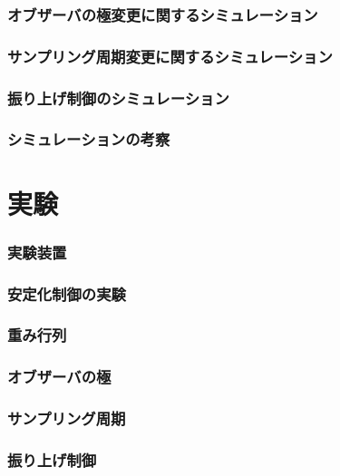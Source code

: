 \documentclass[a4j,11pt,twoside]{jbook}
\begin{document}
\subsection{オブザーバの極変更に関するシミュレーション}

\subsection{サンプリング周期変更に関するシミュレーション}

\subsection{振り上げ制御のシミュレーション}

\subsection{シミュレーションの考察}


\chapter{実験}

\subsection{実験装置}

\subsection{安定化制御の実験}

\subsection{重み行列}

\subsection{オブザーバの極}

\subsection{サンプリング周期}

\subsection{振り上げ制御}
\end{document}
